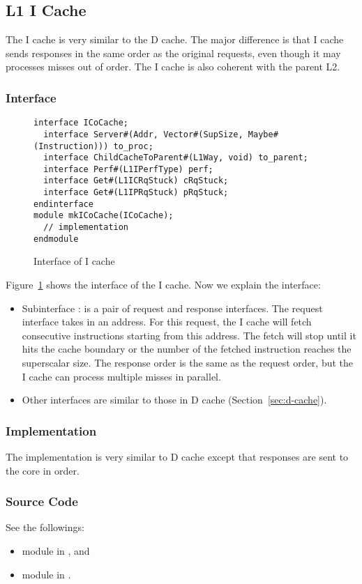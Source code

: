 \subsection{L1 I Cache}

The I cache is very similar to the D cache.
The major difference is that I cache sends responses in the same order as the original requests, even though it may processes misses out of order.
The I cache is also coherent with the parent L2.

\subsubsection{Interface}

\begin{figure}
\begin{lstlisting}[caption={}]
interface ICoCache;
  interface Server#(Addr, Vector#(SupSize, Maybe#(Instruction))) to_proc;
  interface ChildCacheToParent#(L1Way, void) to_parent;
  interface Perf#(L1IPerfType) perf;
  interface Get#(L1ICRqStuck) cRqStuck;
  interface Get#(L1IPRqStuck) pRqStuck;
endinterface
module mkICoCache(ICoCache);
  // implementation
endmodule
\end{lstlisting}
\caption{Interface of I cache}\label{fig:i-cache-ifc}
\end{figure}

Figure~\ref{fig:i-cache-ifc} shows the interface of the I cache.
Now we explain the interface:
\begin{itemize}
    \item Subinterface : is a pair of request and response interfaces.
    The request interface takes in an address.
    For this request, the I cache will fetch consecutive instructions starting from this address.
    The fetch will stop until it hits the cache boundary or the number of the fetched instruction reaches the superscalar size.
    The response order is the same as the request order, but the I cache can process multiple misses in parallel.
    \item Other interfaces are similar to those in D cache (Section~\ref{sec:d-cache}).
\end{itemize}

\subsubsection{Implementation}
The implementation is very similar to D cache except that responses are sent to the core in order.

\subsubsection{Source Code}
See the followings:
\begin{itemize}
    \item module  in , and
    \item module  in .
\end{itemize}

